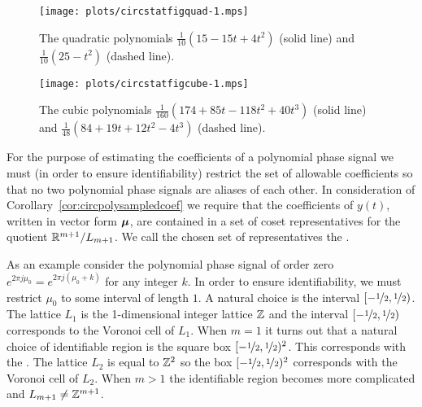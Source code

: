 \documentclass[journal]{IEEEtran}
\begin{document}
\begin{figure}[p]
	\centering
		\texttt{[image: plots/circstatfigquad-1.mps]}
		\caption{The quadratic polynomials $\tfrac{1}{10} (15 - 15 t + 4 t^2)$ (solid line) and $\tfrac{1}{10}(25 -  t^2)$  (dashed line).}
		\label{fig:circstatplot_quad}
\end{figure}

\begin{figure}[p]
	\centering
		\texttt{[image: plots/circstatfigcube-1.mps]}
		\caption{The cubic polynomials $\tfrac{1}{160} (174 + 85 t - 118 t^2 + 40 t^3)$ (solid line) and $\tfrac{1}{48} (84 + 19 t + 12 t^2 - 4 t^3)$  (dashed line).}
		\label{fig:circstatplot_cube}
\end{figure}

For the purpose of estimating the coefficients of a polynomial phase signal we must (in order to ensure identifiability) restrict the set of allowable coefficients so that no two polynomial phase signals are aliases of each other. In consideration of Corollary~\ref{cor:circpolysampledcoef} we require that the coefficients of $y(t)$, written in vector form $\boldsymbol{\mu}$, are contained in a set of coset representatives for the quotient ${\mathbb R}^{m+1}/L_{m+1}$.  We call the chosen set of representatives the .

As an example consider the polynomial phase signal of order zero $e^{2\pi j \mu_0} = e^{2\pi j(\mu_0 + k)}$ for any integer $k$.  In order to ensure identifiability, we must restrict $\mu_0$ to some interval of length $1$.  A natural choice is the interval $[-\nicefrac{1}{2}, \nicefrac{1}{2})$. The lattice $L_1$ is the 1-dimensional integer lattice ${\mathbb Z}$ and the interval $[-\nicefrac{1}{2}, \nicefrac{1}{2})$ corresponds to the Voronoi cell of $L_1$. 
When $m=1$ it turns out that a natural choice of identifiable region is the square box $[-\nicefrac{1}{2}, \nicefrac{1}{2})^2$. This corresponds with the .  The lattice $L_2$ is equal to ${\mathbb Z}^2$ so the box $[-\nicefrac{1}{2}, \nicefrac{1}{2})^2$ corresponds with the Voronoi cell of $L_2$.  
When $m > 1$ the identifiable region becomes more complicated and $L_{m+1} \neq {\mathbb Z}^{m+1}$. %
\end{document}
